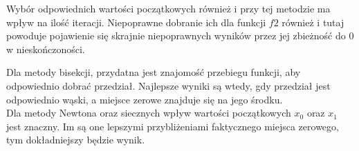 \documentclass[15pt, a4paper]{article}
\begin{document}
\noindent Wybór odpowiednich wartości początkowych również i przy tej metodzie ma wpływ na ilość iteracji. Niepoprawne dobranie ich dla funkcji \(f2\) również i tutaj powoduje pojawienie się skrajnie niepoprawnych wyników przez jej zbieżność do 0 w nieskończoności. 


\noindent Dla metody bisekcji, przydatna jest znajomość przebiegu funkcji, aby odpowiednio dobrać przedział. Najlepsze wyniki są wtedy, gdy przedział jest odpowiednio wąski, a miejsce zerowe znajduje się na jego środku. \\
Dla metody Newtona oraz siecznych wpływ wartości początkowych \(x_0\) oraz \(x_1\) jest znaczny. Im są one lepszymi przybliżeniami faktycznego miejsca zerowego, tym dokładniejszy będzie wynik. 
\end{document}
